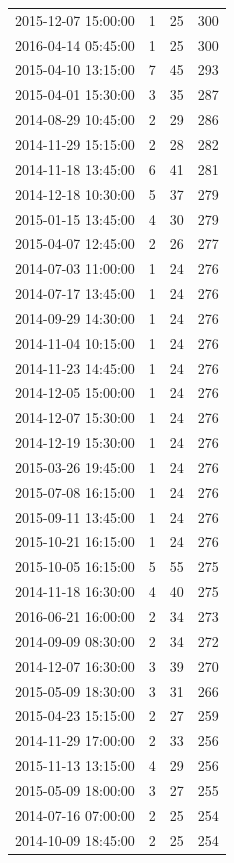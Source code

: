 \begin{tabular}{lrrr}
2015-12-07 15:00:00 & 1 & 25 & 300 \\
2016-04-14 05:45:00 & 1 & 25 & 300 \\
2015-04-10 13:15:00 & 7 & 45 & 293 \\
2015-04-01 15:30:00 & 3 & 35 & 287 \\
2014-08-29 10:45:00 & 2 & 29 & 286 \\
2014-11-29 15:15:00 & 2 & 28 & 282 \\
2014-11-18 13:45:00 & 6 & 41 & 281 \\
2014-12-18 10:30:00 & 5 & 37 & 279 \\
2015-01-15 13:45:00 & 4 & 30 & 279 \\
2015-04-07 12:45:00 & 2 & 26 & 277 \\
2014-07-03 11:00:00 & 1 & 24 & 276 \\
2014-07-17 13:45:00 & 1 & 24 & 276 \\
2014-09-29 14:30:00 & 1 & 24 & 276 \\
2014-11-04 10:15:00 & 1 & 24 & 276 \\
2014-11-23 14:45:00 & 1 & 24 & 276 \\
2014-12-05 15:00:00 & 1 & 24 & 276 \\
2014-12-07 15:30:00 & 1 & 24 & 276 \\
2014-12-19 15:30:00 & 1 & 24 & 276 \\
2015-03-26 19:45:00 & 1 & 24 & 276 \\
2015-07-08 16:15:00 & 1 & 24 & 276 \\
2015-09-11 13:45:00 & 1 & 24 & 276 \\
2015-10-21 16:15:00 & 1 & 24 & 276 \\
2015-10-05 16:15:00 & 5 & 55 & 275 \\
2014-11-18 16:30:00 & 4 & 40 & 275 \\
2016-06-21 16:00:00 & 2 & 34 & 273 \\
2014-09-09 08:30:00 & 2 & 34 & 272 \\
2014-12-07 16:30:00 & 3 & 39 & 270 \\
2015-05-09 18:30:00 & 3 & 31 & 266 \\
2015-04-23 15:15:00 & 2 & 27 & 259 \\
2014-11-29 17:00:00 & 2 & 33 & 256 \\
2015-11-13 13:15:00 & 4 & 29 & 256 \\
2015-05-09 18:00:00 & 3 & 27 & 255 \\
2014-07-16 07:00:00 & 2 & 25 & 254 \\
2014-10-09 18:45:00 & 2 & 25 & 254 \\

\end{tabular}
